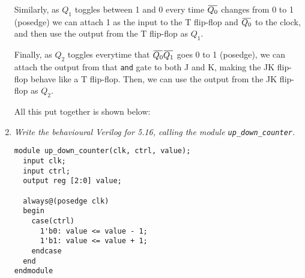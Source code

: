 \documentclass[12pt]{article}
\newcommand{\overbar}[1]
    {\mkern1.5mu\overline{\mkern-1.5mu#1\mkern-1.5mu}\mkern1.5mu}
\begin{document}
\begin{enumerate}
    Similarly, as $Q_1$ toggles between 1 and 0 every time
      $\overbar{Q_0}$ changes from 0 to 1 (posedge) we can attach 1 as the input
      to the T flip-flop and $\overbar{Q_0}$ to the clock, and then use the
      output from the T flip-flop as $Q_1$.

    Finally, as $Q_2$ toggles everytime that $\overbar{Q_0}\overbar{Q_1}$ goes
      0 to 1 (posedge), we can attach the output from that {\tt and} gate to
      both J and K, making the JK flip-flop behave like a T flip-flop. Then, we
      can use the output from the JK flip-flop as $Q_2$.

    All this put together is shown below:

    \begin{center}
    \end{center}

  \newpage
  \item \textit{Write the behavioural Verilog for 5.16, calling the module
                \texttt{up\_down\_counter}.}

    \begin{Verbatim}
module up_down_counter(clk, ctrl, value);
  input clk;
  input ctrl;
  output reg [2:0] value;

  always@(posedge clk)
  begin
    case(ctrl)
      1'b0: value <= value - 1;
      1'b1: value <= value + 1;
    endcase
  end
endmodule
    \end{Verbatim}
\end{enumerate}
\end{document}
